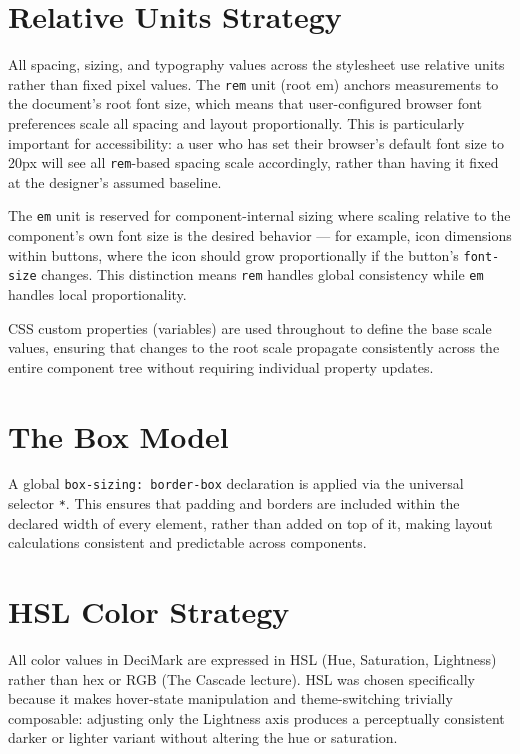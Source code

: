 \documentclass[11pt,a4paper]{book}
\begin{document}
\section{Relative Units Strategy}

All spacing, sizing, and typography values across the stylesheet use relative units rather than fixed pixel values. The \texttt{rem} unit (root em) anchors measurements to the document's root font size, which means that user-configured browser font preferences scale all spacing and layout proportionally. This is particularly important for accessibility: a user who has set their browser's default font size to 20px will see all \texttt{rem}-based spacing scale accordingly, rather than having it fixed at the designer's assumed baseline.

The \texttt{em} unit is reserved for component-internal sizing where scaling relative to the component's own font size is the desired behavior --- for example, icon dimensions within buttons, where the icon should grow proportionally if the button's \texttt{font-size} changes. This distinction means \texttt{rem} handles global consistency while \texttt{em} handles local proportionality.

CSS custom properties (variables) are used throughout to define the base scale values, ensuring that changes to the root scale propagate consistently across the entire component tree without requiring individual property updates.

\section{The Box Model}

A global \texttt{box-sizing: border-box} declaration is applied via the universal selector \texttt{*}. This ensures that padding and borders are included within the declared width of every element, rather than added on top of it, making layout calculations consistent and predictable across components.
\section{HSL Color Strategy}

All color values in DeciMark are expressed in HSL (Hue, Saturation, Lightness) rather than hex or RGB (The Cascade lecture). HSL was chosen specifically because it makes hover-state manipulation and theme-switching trivially composable: adjusting only the Lightness axis produces a perceptually consistent darker or lighter variant without altering the hue or saturation.
\end{document}
